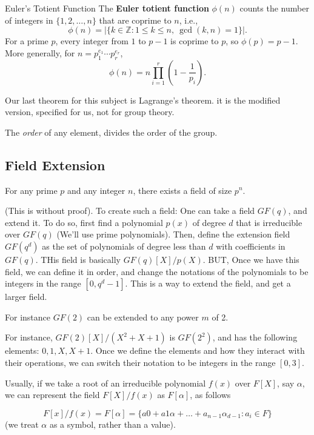 \begin{notice} {Euler's Totient Function}
    The \textbf{Euler totient function} $\phi(n)$ counts the number of integers in $\{1, 2, \dots, n\}$ that are coprime to $n$, i.e.,
    \[
        \phi(n) = \bigl|\{k \in \mathbb{Z} : 1 \le k \le n,\ \gcd(k, n) = 1\}\bigr|.
    \]
    For a prime $p$, every integer from $1$ to $p-1$ is coprime to $p$, so $\phi(p) = p - 1$.
    More generally, for $n = p_1^{e_1} \cdots p_r^{e_r}$,
    \[
        \phi(n) = n \prod_{i=1}^{r} \left(1 - \frac{1}{p_i}\right).
    \]
\end{notice}

Our last theorem for this subject is Lagrange's theorem. it is the modified version, specified for us, not for group theory.

\begin{theorem}\label{theorem:lagrange-groups}
    The \emph{order} of any element, divides the order of the group.
\end{theorem}
\subsection{Field Extension}
\begin{theorem}
    For any prime $p$ and any integer $n$, there exists a field of size $p^n$.
\end{theorem}

(This is without proof). 
To create such a field:
One can take a field $GF(q)$, and extend it.
To do so, first find a polynomial $p(x)$ of degree $d$ that is irreducible over $GF(q)$
(We'll use prime polynomials).
Then, define the extension field $GF(q^d)$ as the set of polynomials of degree less than $d$ with coefficients in $GF(q)$.
THis field is basically $GF(q)[X]/p(X)$. BUT, Once we have this field, 
we can define it in order, and change the notations of the polynomials to be integers 
in the range $[0,q^d-1]$. This is a way to extend the field, and get a larger field.


For instance $GF(2)$ can be extended to any power $m$ of 2.

For instance, $GF(2)[X]/(X^2+X+1)$ is $GF(2^2)$, and has the following elements:
$0,1,X,X+1$. Once we define the elements and how they interact with their operations, we can 
switch their notation to be integers in the range $[0,3]$. 

\begin{remark}
    Usually,  if we take a root of an irreducible
    polynomial $f(x)$ over $F[X]$, say $\alpha$, we can 
    represent the field $F[X]/f(x)$ as $F[\alpha]$, as follows
    
    $$F[x]/f(x)=F[\alpha]= \{a0 + a1 \alpha + \dots + a_{n-1} \alpha_{d-1} : a_i \in F\}$$
    (we treat $\alpha$ as a symbol, rather than a value). 
\end{remark}


